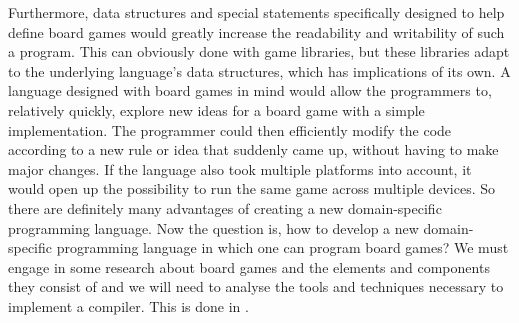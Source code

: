 Furthermore, data structures and special statements specifically
designed to help define board games would greatly increase the
readability and writability of such a program. This can obviously
done with game libraries, but these libraries adapt to the underlying
language's data structures, which has implications of its own. A
language designed with board games in mind would allow the programmers
to, relatively quickly, explore new ideas for a board game with a simple
implementation. The programmer could then efficiently modify the code
according to a new rule or idea that suddenly came up, without having
to make major changes. If the language also took multiple platforms
into account, it would open up the possibility to run the same game
across multiple devices. So there are definitely many advantages of
creating a new domain-specific programming language. Now the question
is, how to develop a new domain-specific programming language in which
one can program board games? We must engage in some research
about board games and the elements and components they consist of and we
will need to analyse the tools and techniques necessary to implement a
compiler. This is done in .
